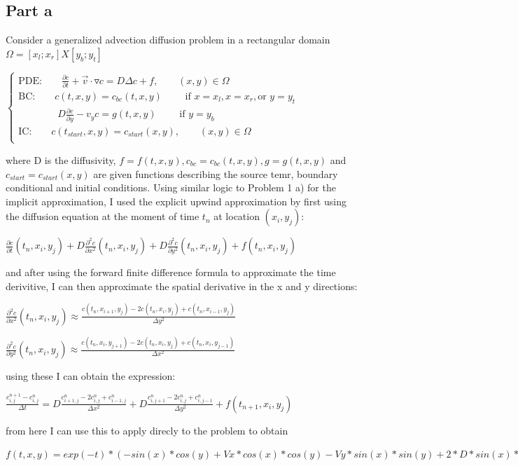 \documentclass[12pt]{article}
\begin{document}
\newpage
\subsection{Part a}\label{sec::a}
Consider a generalized advection diffusion problem in a rectangular domain $\Omega = [x_l;x_r] X [y_b;y_t]$

\begin{center}
$\begin{cases} 
\textrm{PDE:} \quad \quad \frac{\partial c}{\partial t} + \overrightarrow{v} \cdot \triangledown c = D \Delta c + f, \quad \quad(x,y) \in \Omega  \\
\textrm{BC:} \quad \quad c(t,x,y) = c_{bc}(t,x,y) \quad \quad\textrm{  if } x = x_l, x = x_r, \textrm{or } y=y_t \\
\quad \quad \quad \quad D \frac{\partial c}{\partial y} - v_y c = g(t,x,y) \quad \quad \textrm{ if } y = y_b \\
\textrm{IC:}\quad \quad c(t_{start}, x, y) = c_{start} (x,y), \quad \quad (x,y) \in \Omega \\

 \end{cases}$
\end{center}
where D is the diffusivity, $ f = f(t,x,y), c_{bc} = c_{bc}(t,x,y), g = g(t,x,y)$ and $c_{start} = c_{start}(x,y)$ are given functions describing the source temr, boundary conditional and initial conditions. 
Using similar logic to Problem 1 a) for the implicit approximation, I used the explicit upwind approximation by first using the diffusion equation at the moment of time $t_n$ at location $(x_i,y_j)$:
\begin{center}
$\frac{\partial c}{\partial t} (t_{n}, x_i,y_j) + D \frac{\partial ^2 c}{\partial x^2} (t_{n}, x_i,y_j) + D \frac{\partial ^2 c}{\partial y^2} (t_{n}, x_i,y_j) + f (t_{n}, x_i,y_j)$
\end{center}
and after using the forward finite difference formula to approximate the time derivitive, I can then approximate the spatial derivative in the x and y directions:
\begin{center}
$
\frac{\partial ^2 c}{\partial x^2} (t_{n}, x_i,y_j) \approx \frac{c(t_{n}, x_{i+1},y_j) - 2c(t_{n}, x_i,y_j)+c(t_{n}, x_{i-1},y_j)}{\Delta y^2}
$
\end{center}
\begin{center}
$
\frac{\partial ^2 c}{\partial y^2} (t_{n}, x_i,y_j) \approx \frac{c(t_{n}, x_{i},y_{j+1}) - 2c(t_{n}, x_i,y_j)+c(t_{n}, x_{i},y_{j-1})}{\Delta x^2}
$
\end{center}
using these I can obtain the expression:
\begin{center}
$
\frac{c_{i,j}^{n+1}-c_{i,j}^n}{\Delta t} = D \frac{c_{i+1,j}^{n}-2c_{i,j}^{n}+c_{i-1,j}^{n}}{\Delta x^2} + D \frac{c_{i,j+1}^{n}-2c_{i,j}^{n}+c_{i,j-1}^{n}}{\Delta y^2}+ f(t_{n+1}, x_i, y_j)
$
\end{center}
from here I can use this to apply direcly to the problem to obtain
\begin{center}
$
 f(t,x,y)= exp(-t)*(-sin(x)*cos(y) + Vx*cos(x)*cos(y)-Vy*sin(x)*sin(y)+2*D*sin(x)*cos(y))
$
\end{center}
\end{document}
